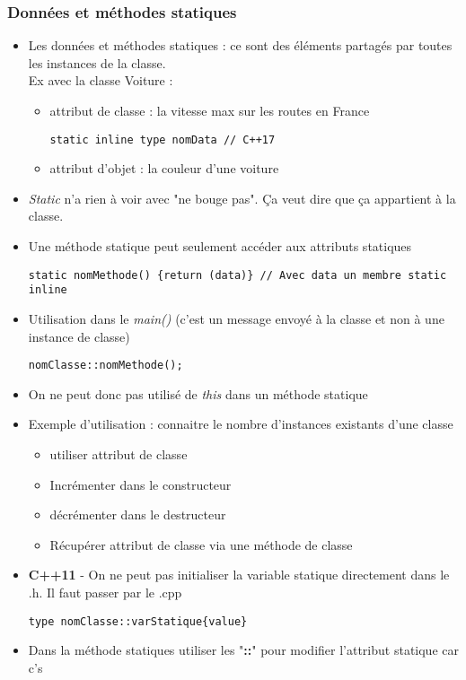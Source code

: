 \documentclass[12pt,a4paper]{article}
\begin{document}
\subsubsection{Données et méthodes statiques}
\begin{itemize}
\item Les données et méthodes statiques : ce sont des éléments partagés par toutes les instances de la classe.\\
Ex avec la classe Voiture :
\begin{itemize}
\item attribut de classe : la vitesse max sur les routes en France
\begin{lstlisting}
static inline type nomData // C++17
\end{lstlisting}
\item attribut d'objet : la couleur d'une voiture
\end{itemize}
\item \textit{Static} n'a rien à voir avec "ne bouge pas". Ça veut dire que ça appartient à la classe.
\item Une méthode statique peut seulement accéder aux attributs statiques
\begin{lstlisting}
static nomMethode() {return (data)} // Avec data un membre static inline
\end{lstlisting}
\item Utilisation dans le \textit{main()} (c'est un message envoyé à la classe et non à une instance de classe)
\begin{lstlisting}
nomClasse::nomMethode();
\end{lstlisting}
\item On ne peut donc pas utilisé de \textit{this} dans un méthode statique
\item Exemple d'utilisation : connaitre le nombre d'instances existants d'une classe
\begin{itemize}
\item utiliser attribut de classe
\item Incrémenter dans le constructeur
\item décrémenter dans le destructeur
\item Récupérer attribut de classe via une méthode de classe
\end{itemize}
\item \textbf{C++11} - On ne peut pas initialiser la variable statique directement dans le .h. Il faut passer par le .cpp
\begin{lstlisting}
type nomClasse::varStatique{value}
\end{lstlisting}
\item Dans la méthode statiques utiliser les "\textbf{::}" pour modifier l'attribut statique car c's
\end{itemize}
\end{document}
